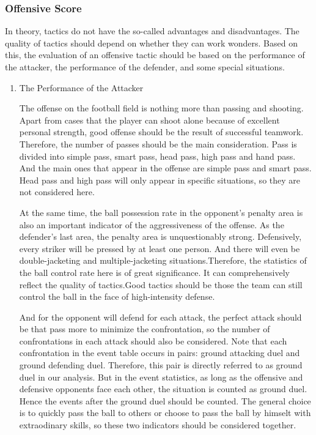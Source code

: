 \documentclass{mcmthesis}
\begin{document}
\subsubsection{Offensive Score}
	In theory, tactics do not have the so-called advantages and disadvantages. The quality of tactics should depend on whether they can work wonders.  Based on this, the evaluation of an offensive tactic should be based on the performance of the attacker, the performance of the defender, and some special situations.
	\begin{enumerate}
	\item The Performance of the Attacker
	
	The offense on the football field is nothing more than passing and shooting. Apart from cases that the player can shoot alone because of excellent personal strength, good offense should be the result of successful teamwork.  Therefore, the number of passes should be the main consideration. Pass is divided into simple pass, smart pass, head pass, high pass and hand pass. And the main ones that appear in the offense are simple pass and smart pass. Head pass and high pass will only appear in specific situations, so they are not considered here.

	At the same time, the ball possession rate in the opponent's penalty area is also an important indicator of the aggressiveness of the offense. As the defender's last area, the penalty area is unquestionably strong.  Defensively, every striker will be pressed by at least one person.  And there will even be double-jacketing and multiple-jacketing situations.Therefore, the statistics of the ball control rate here is of great significance. It can comprehensively reflect the quality of tactics.Good tactics should be those the team can still control the ball in the face of high-intensity defense.

	And for the opponent will defend for each attack, the perfect attack should be that pass more to minimize the confrontation, so the number of confrontations in each attack should also be considered.  Note that each confrontation in the event table occurs in pairs: ground attacking duel and ground defending duel.  Therefore, this pair is directly referred to as ground duel in our analysis.  But in the event statistics, as long as the offensive and defensive opponents face each other, the situation is counted as ground duel.  Hence the events after the ground duel should be counted. The general choice is to quickly pass the ball to others or choose to pass the ball by himselt with extraodinary skills, so these two indicators should be considered together.


\end{enumerate}
\end{document}
